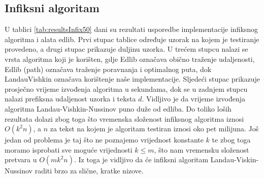 \documentclass[times, utf8, zavrsni]{fer}
\begin{document}
\subsection{Infiksni algoritam}
U tablici \ref{tab:resultsInfix50} dani su rezultati usporedbe implementacije infiksnog algoritma i alata edlib. Prvi stupac tablice određuje uzorak na kojem je testiranje provedeno, a drugi stupac prikazuje duljinu uzorka. U trećem stupcu nalazi se vrsta algoritma koji je korišten, gdje Edlib označava obično traženje udaljenosti, Edlib (path) označava traženje poravnanja i optimalnog puta, dok LandauVishkin označava korištenje naše implementacije. Sljedeći stupac prikazuje prosječno vrijeme izvođenja algoritma u sekundama, dok se u zadnjem stupcu nalazi prefiksna udaljenost uzorka i teksta $d$. Vidljivo je da vrijeme izvođenja algoritma Landau-Vishkin-Nussinov puno duže od edliba. Do toliko loših rezultata dolazi zbog toga što vremenska složenost infiksnog algoritma iznosi $O(k^2n)$, a $n$ za tekst na kojem je algoritam testiran iznosi oko pet milijuna. Još jedan od problema je taj što ne poznajemo vrijednost konstante $k$ te zbog toga moramo isprobati sve moguće vrijednosti $k\leq m$, što nam vremensku složenost pretvara u $O(mk^2n)$. Iz toga je vidljivo da će infiksni algoritam Landau-Viskin-Nussinov raditi brzo za slične, kratke nizove.
\end{document}
